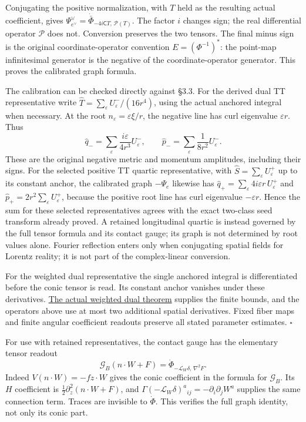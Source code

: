 \documentclass[
  english,
  11pt,
  reqno]{amsart}
\begin{document}
Conjugating the positive normalization, with \(T\) held as the resulting
actual coefficient, gives
\(\Psi^\vee_{e^\vee}=\dot{\bar\Phi}_{-4i\mathsf CT,\,\mathcal P(T)}\).
The factor \(i\) changes sign; the real differential operator
\(\mathcal P\) does not. Conversion preserves the two tensors. The final
minus sign is the original coordinate-operator convention
\(E=(\Phi^{-1})^*\): the point-map infinitesimal generator is the
negative of the coordinate-operator generator. This proves the
calibrated graph formula.

The calibration can be checked directly against §3.3. For the derived
dual TT representative write
\(\widehat T=\sum_{\varepsilon}U^-_\varepsilon/(16r^4)\), using the
actual anchored integral when necessary. At the root
\(n_\varepsilon=\varepsilon\xi/r\), the negative line has curl
eigenvalue \(\varepsilon r\). Thus%
 \[
\widehat q_-=\sum_\varepsilon\frac{i\varepsilon}{4r^3}U^-_\varepsilon,
\qquad
\widehat p_-=\sum_\varepsilon\frac1{8r^2}U^-_\varepsilon.
\] These are the original negative metric and momentum amplitudes,
including their signs. For the selected positive TT quartic
representative, with \(\widehat S=\sum_\varepsilon U^+_\varepsilon\) up
to its constant anchor, the calibrated graph \(-\Psi_e\) likewise has
\(\widehat q_+=\sum_\varepsilon4i\varepsilon r\,U^+_\varepsilon\) and
\(\widehat p_+=2r^2\sum_\varepsilon U^+_\varepsilon\), because the
positive root line has curl eigenvalue \(-\varepsilon r\). Hence the sum
for these selected representatives agrees with the exact two-class seed
transform already proved. A retained longitudinal quartic is instead
governed by the full tensor formula and its contact gauge; its graph is
not determined by root values alone. Fourier reflection enters only when
conjugating spatial fields for Lorentz reality; it is not part of the
complex-linear conversion.

For the weighted dual representative the single anchored integral is
differentiated before the conic tensor is read. Its constant anchor
vanishes under these derivatives.
\hyperref[thm:online-actual-weighted-negative-dual]{The actual weighted
dual theorem} supplies the finite bounds, and the operators above use at
most two additional spatial derivatives. Fixed fiber maps and finite
angular coefficient readouts preserve all stated parameter estimates.
\hfill\(\square\)

For use with retained representatives, the contact gauge has the
elementary tensor readout%
 \[
\mathcal G_B(n\cdot W+F)
=\dot\Phi_{-\mathcal L_W\delta,\,\nabla^2F}.
\] Indeed \(V(n\cdot W)=-fz\cdot W\) gives the conic coefficient in the
formula for \(\mathcal G_B\). Its \(H\) coefficient is
\(\tfrac12\partial_z^2(n\cdot W+F)\), and
\(\Gamma(-\mathcal L_W\delta)^a{}_{ij}=-\partial_i\partial_jW^a\)
supplies the same connection term. Traces are invisible to \(\dot\Phi\).
This verifies the full graph identity, not only its conic part.
\end{document}
